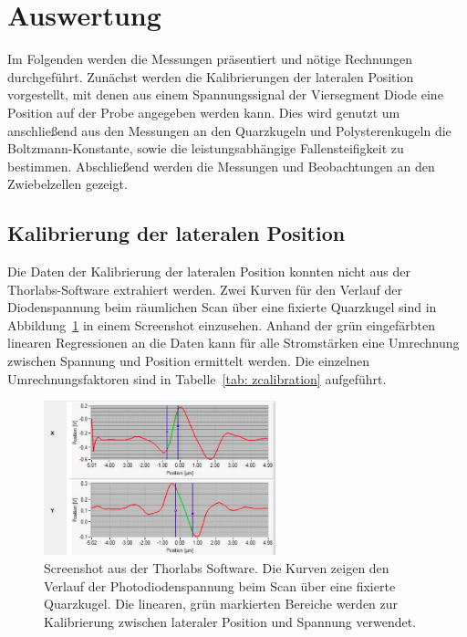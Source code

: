 \section{Auswertung}
Im Folgenden werden die Messungen präsentiert und nötige Rechnungen durchgeführt. Zunächst
werden die Kalibrierungen der lateralen Position vorgestellt, mit denen aus einem Spannungssignal der
Viersegment Diode eine Position auf der Probe angegeben werden kann. Dies wird genutzt um anschließend
aus den Messungen an den Quarzkugeln und Polysterenkugeln die Boltzmann-Konstante, sowie die leistungsabhängige
Fallensteifigkeit zu bestimmen. Abschließend werden die Messungen und Beobachtungen an den Zwiebelzellen
gezeigt.

\subsection{Kalibrierung der lateralen Position}
Die Daten der Kalibrierung der lateralen Position konnten nicht aus der Thorlabs-Software extrahiert werden. Zwei
Kurven für den Verlauf der Diodenspannung beim räumlichen Scan über eine fixierte Quarzkugel sind in Abbildung~\ref{fig: calibration}
in einem Screenshot einzusehen. Anhand der grün eingefärbten linearen Regressionen an die Daten kann für alle Stromstärken eine
Umrechnung zwischen Spannung und Position ermittelt werden. Die einzelnen Umrechnungsfaktoren sind in Tabelle~\ref{tab: zcalibration} aufgeführt.

\begin{figure}
  \centering
  \includegraphics[width = 0.6\textwidth]{../analysis/data/i_quarz/70mA/position_calibration_70mA.png}
  \caption{Screenshot aus der Thorlabs Software. Die Kurven zeigen den Verlauf der Photodiodenspannung beim Scan über
  eine fixierte Quarzkugel. Die linearen, grün markierten Bereiche werden zur Kalibrierung zwischen lateraler Position und Spannung verwendet.}
  \label{fig: calibration}
\end{figure}


